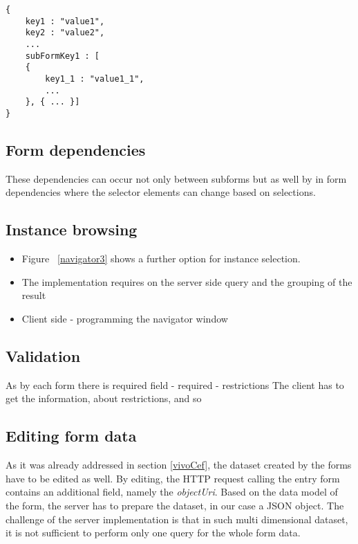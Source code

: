 \begin{lstlisting}[captionpos=b, caption=JSON object of the form, label=3rd:sparql,
basicstyle=\footnotesize,frame=single]
{
	key1 : "value1",
	key2 : "value2",
	...
	subFormKey1 : [
	{
		key1_1 : "value1_1",
		...				
	}, { ... }]
}
\end{lstlisting}


\subsection{Form dependencies} \label{formDependencies}



These dependencies can occur not only between subforms but as well by in form dependencies where the selector elements can change based on selections.

\subsection{Instance browsing}


\begin{itemize}
	\item Figure ~\ref{navigator3} shows a further option for instance selection. 
\end{itemize}


\begin{itemize}
	\item The implementation requires on the server side query and the grouping of the result
	\item Client side - programming the navigator window
\end{itemize}


\subsection{Validation}

As by each form there is required field - required - restrictions
The client has to get the information, about restrictions, and so  


\subsection{Editing form data}
	
As it was already addressed in section \ref{vivoCef}, the dataset created by the forms have to be edited as well. By editing, the HTTP request calling the entry form contains an additional field, namely the \textit{objectUri}. Based on the data model of the form, the server has to prepare the dataset, in our case a JSON object. The challenge of the server implementation is that in such multi dimensional dataset, it is not sufficient to perform only one query for the whole form data.

